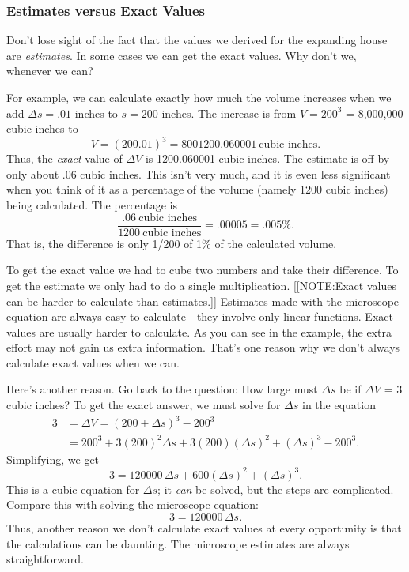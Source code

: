 \subsubsection{Estimates versus Exact Values}
\label{subsubsec:estimates-versus-exact-values}

Don't lose sight of the fact that the values we derived for the
expanding house are {\em estimates}.  In some cases we can get the
exact values.  Why don't we, whenever we can?

For example, we can calculate exactly how much the volume increases
when we add $\Delta s = .01$ inches to $s = 200$ inches.  The increase
is from $V = 200^3$ = 8,000,000 cubic inches to
\[
V = (200.01)^3 = 8001200.060001 \ \mbox{cubic inches}.
\]
Thus, the {\em exact\/} value of $\Delta V$ is 1200.060001 cubic
inches.  The estimate is off by only about .06 cubic inches.  This
isn't very much, and it is even less significant when you think of it
as a percentage of the volume (namely 1200 cubic inches) being
calculated.  The percentage is
\[
\dfrac{.06 \ \mbox{cubic inches}}
              {1200 \ \mbox{cubic inches}} = .00005 = .005\%.
\]
That is, the difference is only 1/200 of 1\% of the calculated volume.

To get the exact value we had to cube two numbers and take their
difference.  To get the estimate we only had to do a single
multiplication.
[[NOTE:Exact values can be harder to calculate than estimates.]]
Estimates made with the microscope equation are always easy to
calculate---they involve only linear functions.  Exact values are
usually harder to calculate.  As you can see in the example, the extra
effort may not gain us extra information.  That's one reason why we
don't always calculate exact values when we can.

Here's another reason.  Go back to the question: How large must
$\Delta s$ be if $\Delta V$ = 3 cubic inches?  To get the exact
answer, we must solve for $\Delta s$ in the equation
\begin{align*}
3 &= \Delta V = (200 + \Delta s)^3 - 200^3 \\
  &= 200^3 + 3(200)^2\Delta s + 3(200)(\Delta s)^2 + 
		(\Delta s)^3 - 200^3.
\end{align*}
Simplifying, we get
\[
3 = 120000\,\Delta s + 600(\Delta s)^2 + (\Delta s)^3.
\]
This is a cubic equation for $\Delta s$; it {\em can\/} be solved, but
the steps are complicated.  Compare this with solving the microscope
equation:
\[
3 = 120000\,\Delta s.
\]
Thus, another reason we don't calculate exact values at every
opportunity is that the calculations can be daunting.  The microscope
estimates are always straightforward.

